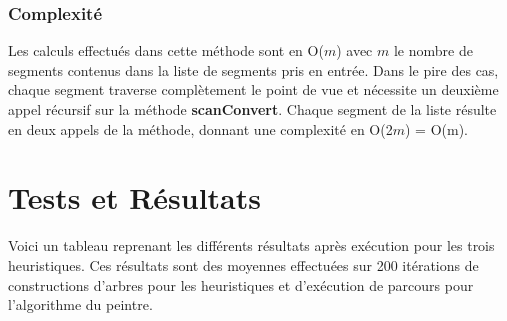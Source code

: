 \documentclass[11pt,a4paper]{article}
\theoremstyle{definition}
\theoremstyle{remark}
\begin{document}
\subsubsection{Complexité}
Les calculs effectués dans cette méthode sont en O($m$) avec $m$ le nombre de segments contenus dans la liste de segments pris en entrée. Dans le pire des cas, chaque segment traverse complètement le point de vue et nécessite un deuxième appel récursif sur la méthode \textbf{scanConvert}. Chaque segment de la liste résulte en deux appels de la méthode, donnant une complexité en O(2$m$) = O(m).

\section{Tests et Résultats}

Voici un tableau reprenant les différents résultats après exécution pour les trois heuristiques. Ces résultats sont des moyennes effectuées sur 200 itérations de constructions d'arbres pour les heuristiques et d'exécution de parcours pour l'algorithme du peintre. 
\end{document}
